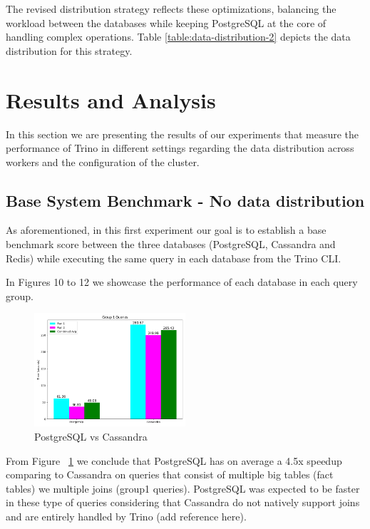 \documentclass[conference]{IEEEtran}
\begin{document}
The revised distribution strategy reflects these optimizations, balancing the workload between the databases
while keeping PostgreSQL at the core of handling complex operations.
Table \ref{table:data-distribution-2} depicts the data distribution for this strategy.

\section{Results and Analysis}

In this section we are presenting the results of our experiments that measure the performance of Trino in different settings regarding the data distribution across workers and the configuration of the cluster.

\subsection{Base System Benchmark - No data distribution}
\label{sec:no-data-distribution}

As aforementioned, in this first experiment our goal is to establish a base benchmark score between the three databases (PostgreSQL, Cassandra and Redis) while executing the same query in each database from the Trino CLI.

In Figures 10 to 12 we showcase the performance of each database in each query group.

\begin{figure}[h]
	\centering
	\includegraphics[width=0.5\textwidth]{images/DBs_bench_no_distro/group1.png}
	\caption{PostgreSQL vs Cassandra}
	\label{fig:psql-cass-group1}
\end{figure}

From Figure ~\ref{fig:psql-cass-group1} we conclude that PostgreSQL has on average a 4.5x speedup comparing to Cassandra on queries that consist of multiple big tables (fact tables) we multiple joins (group1 queries). PostgreSQL was expected to be faster in these type of queries considering that Cassandra do not natively support joins and are entirely handled by Trino (add reference here).
\end{document}
